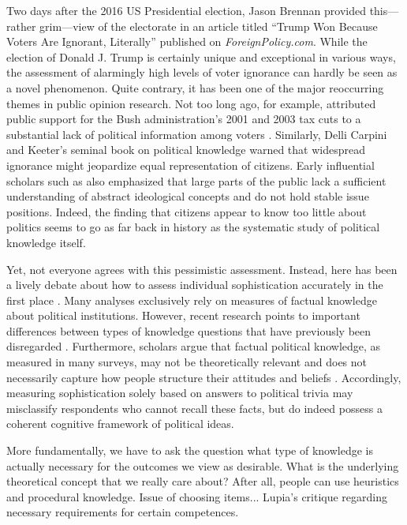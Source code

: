 \documentclass[12pt]{article}
\begin{document}
Two days after the 2016 US Presidential election, Jason Brennan provided this--- rather grim---view of the electorate in an article titled ``Trump Won Because Voters Are Ignorant, Literally'' published on \textit{ForeignPolicy.com}. While the election of Donald J. Trump is certainly unique and exceptional in various ways, the assessment of alarmingly high levels of voter ignorance can hardly be seen as a novel phenomenon. Quite contrary, it has been one of the major reoccurring themes in public opinion research. Not too long ago, for example, \citet{bartels2005homer} attributed public support for the Bush administration's 2001 and 2003 tax cuts to a substantial lack of political information among voters \citep[but see][]{lupia2007were,bartels2007homer}. Similarly, Delli Carpini and Keeter's \citeyearpar{carpini1996americans} seminal book on political knowledge warned that widespread ignorance might jeopardize equal representation of citizens. Early influential scholars such as \citet{converse1964nature} also emphasized that large parts of the public lack a sufficient understanding of abstract ideological concepts and do not hold stable issue positions. Indeed, the finding that citizens appear to know too little about politics seems to go as far back in history as the systematic study of political knowledge itself.

Yet, not everyone agrees with this pessimistic assessment. Instead, here has been a lively debate about how to assess individual sophistication accurately in the first place \citep[e.g.][]{mondak2000reconsidering,mondak2001asked,sturgis2008experiment,debell2013harder,pietryka2013analysis}. Many analyses exclusively rely on measures of factual knowledge about political institutions. However, recent research points to important differences between types of knowledge questions that have previously been disregarded \citep{barabas2014question}. Furthermore, scholars argue that factual political knowledge, as measured in many surveys, may not be theoretically relevant \citep{lupia2006elitism} and does not necessarily capture how people structure their attitudes and beliefs \citep[e.g.][]{luskin1987measuring}. Accordingly, measuring sophistication solely based on answers to political trivia may misclassify respondents who cannot recall these facts, but do indeed possess a coherent cognitive framework of political ideas.

More fundamentally, we have to ask the question what type of knowledge is actually necessary for the outcomes we view as desirable. What is the underlying theoretical concept that we really care about? After all, people can use heuristics and procedural knowledge. Issue of choosing items... Lupia's critique regarding necessary requirements for certain competences. 
\end{document}

